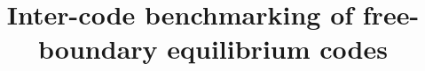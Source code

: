 \documentclass{article}
\begin{document}
\title{Inter-code benchmarking of free-boundary equilibrium codes}




{}

% 

% 
\end{document}

